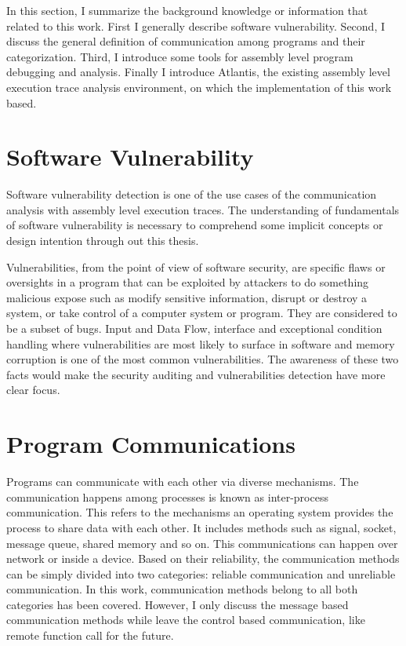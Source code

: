 \label{chapter:Bac}
In this section, I summarize the background knowledge or information that related to this work. First I generally describe software vulnerability. Second, I discuss the general definition of communication among programs and their categorization. Third, I introduce some tools for assembly level program debugging and analysis. Finally I introduce Atlantis, the existing assembly level execution trace analysis environment, on which the implementation of this work based.

\section{Software Vulnerability}
Software vulnerability detection is one of the use cases of the communication analysis with assembly level execution traces. The understanding of fundamentals of software vulnerability is necessary to comprehend some implicit concepts or design intention through out this thesis. 

Vulnerabilities, from the point of view of software security, are specific flaws or oversights in a program that can be exploited by attackers to do something malicious expose such as modify sensitive information, disrupt or destroy a system, or take control of a computer system or program. They are considered to be a subset of bugs. Input and Data Flow, interface and exceptional condition handling where vulnerabilities are most likely to surface in software and memory corruption is one of the most common vulnerabilities. The awareness of these two facts would make the security auditing and vulnerabilities detection have more clear focus. \cite{dowd_art_2006}

\section{Program Communications}
Programs can communicate with each other via diverse mechanisms. The communication happens among processes is known as inter-process communication. This refers to the mechanisms an operating system provides the process to share data with each other. It includes methods such as signal, socket, message queue, shared memory and so on.\cite{garrido2000inter} This communications can happen over network or inside a device. Based on their reliability, the communication methods can be simply divided into two categories: reliable communication and unreliable communication. In this work, communication methods belong to all both categories has been covered. However, I only discuss the message based communication methods while leave the control based communication, like remote function call for the future.

